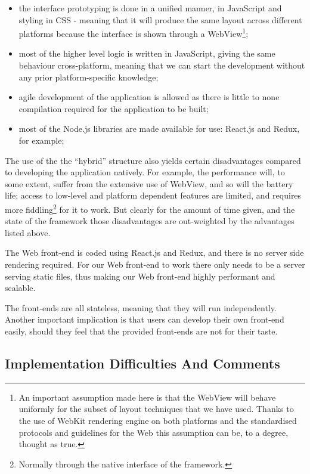 \begin{itemize}
	\item the interface prototyping is done in a unified manner, in JavaScript and styling in CSS - meaning that it will produce the same layout across different platforms because the interface is shown through a WebView\footnote{An important assumption made here is that the WebView will behave uniformly for the subset of layout techniques that we have used. Thanks to the use of WebKit rendering engine on both platforms and the standardised protocols and guidelines for the Web this assumption can be, to a degree, thought as true.};
	\item most of the higher level logic is written in JavaScript, giving the same behaviour cross-platform, meaning that we can start the development without any prior platform-specific knowledge;
	\item agile development of the application is allowed as there is little to none compilation required for the application to be built;
	\item most of the Node.js libraries are made available for use: React.js and Redux, for example;
\end{itemize}

The use of the the ``hybrid'' structure also yields certain disadvantages compared to developing the application natively. For example, the performance will, to some extent, suffer from the extensive use of WebView, and so will the battery life; access to low-level and platform dependent features are limited, and requires more fiddling\footnote{Normally through the native interface of the framework.} for it to work. But clearly for the amount of time given, and the state of the framework those disadvantages are out-weighted by the advantages listed above.

The Web front-end is coded using React.js and Redux, and there is no server side rendering required. For our Web front-end to work there only needs to be a server serving static files, thus making our Web front-end highly performant and scalable.

The front-ends are all stateless, meaning that they will run independently. Another important implication is that users can develop their own front-end easily, should they feel that the provided front-ends are not for their taste.

\subsection{Implementation Difficulties And Comments}

